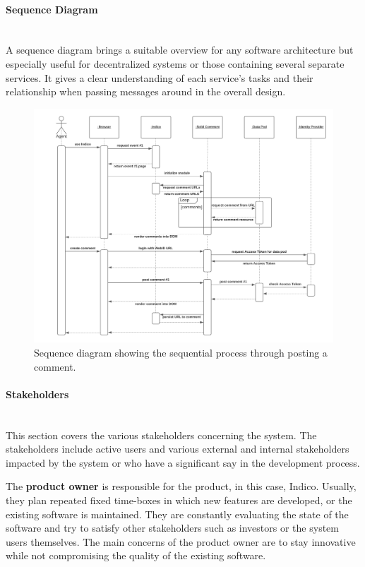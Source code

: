 \paragraph{Sequence Diagram}\mbox{}\\

A sequence diagram brings a suitable overview for any software architecture but especially useful for decentralized systems or those containing several separate services. It gives a clear understanding of each service’s tasks and their relationship when passing messages around in the overall design.

\begin{figure}[H]
    \centering
    \includegraphics[width=\textwidth]{prototype/graphs/poc-comment-sequence_diagram.png}
    \caption{Sequence diagram showing the sequential process through posting a comment.}
    \label{fig:poc-comment-sequence_diagram}
\end{figure}
\vspace{0.5cm}
\paragraph{Stakeholders}\label{poc1-stakeholders}\mbox{}\\

This section covers the various stakeholders concerning the system. The stakeholders include active users and various external and internal stakeholders impacted by the system or who have a significant say in the development process.

The \textbf{product owner} is responsible for the product, in this case, Indico. Usually, they plan repeated fixed time-boxes in which new features are developed, or the existing software is maintained. They are constantly evaluating the state of the software and try to satisfy other stakeholders such as investors or the system users themselves. The main concerns of the product owner are to stay innovative while not compromising the quality of the existing software.

